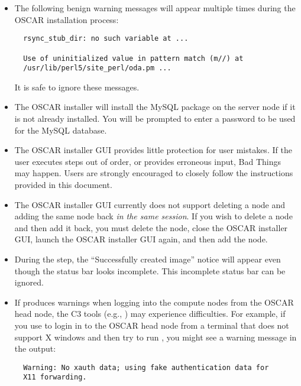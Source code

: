 \begin{itemize}
\item The following benign warning messages will appear multiple times
  during the OSCAR installation process:

\begin{verbatim}
  rsync_stub_dir: no such variable at ...

  Use of uninitialized value in pattern match (m//) at 
  /usr/lib/perl5/site_perl/oda.pm ...
\end{verbatim}
\endchange

  It is safe to ignore these messages.
  
\item The OSCAR installer will install the MySQL package on the server
  node if it is not already installed.  You will be prompted to enter a
\begchange
  password to be used for the MySQL database.
\endchange  

\item The OSCAR installer GUI provides little protection for user
  mistakes.  If the user executes steps out of order, or provides
  erroneous input, Bad Things may happen.  Users are strongly
  encouraged to closely follow the instructions provided in this
  document.

\item The OSCAR installer GUI currently does not support deleting a
  node and adding the same node back {\em in the same session}.  If
  you wish to delete a node and then add it back, you must delete the
  node, close the OSCAR installer GUI, launch the OSCAR installer GUI
  again, and then add the node.

\item During the  step, the ``Successfully
  created image'' notice will appear even though the status bar looks
  incomplete.  This incomplete status bar can be ignored.

\begchange
\item If  produces warnings when logging into the compute
  nodes from the OSCAR head node, the C3 tools (e.g., ) may
  experience difficulties.  For example, if you use  to login
  in to the OSCAR head node from a terminal that does not support X
  windows and then try to run , you might see a warning
  message in the  output:

\begin{verbatim}
  Warning: No xauth data; using fake authentication data for 
  X11 forwarding.
\end{verbatim}
  

\end{itemize}
